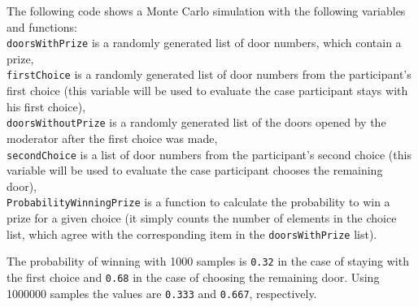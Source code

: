\documentclass{tstextbook}
\begin{document}
\begin{example}
The following code shows a Monte Carlo simulation with the following variables and functions:\\
\texttt{doorsWithPrize} is a randomly generated list of door numbers, which contain a prize,\\
\texttt{firstChoice} is a randomly generated list of door numbers from the participant's first choice (this variable will be used to evaluate the case participant stays with his first choice),\\
\texttt{doorsWithoutPrize} is a randomly generated list of the doors opened by the moderator after the first choice was made,\\
\texttt{secondChoice} is a list of door numbers from the participant's second choice (this variable will be used to evaluate the case participant chooses the remaining door),\\
\texttt{ProbabilityWinningPrize} is a function to calculate the probability to win a prize for a given choice (it simply counts the number of elements in the choice list, which agree with the corresponding item in the \texttt{doorsWithPrize} list). 
\\   

The probability of winning with 1000 samples is \texttt{0.32} in the case of staying with the first choice and \texttt{0.68} in the case of choosing the remaining door. Using 1000000 samples the values are \texttt{0.333} and \texttt{0.667}, respectively. 
\end{example}
\end{document}
